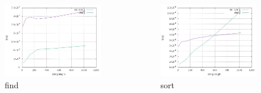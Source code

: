 \documentclass{beamer}
\begin{document}
\begin{frame}
    \begin{columns}[T]
        \begin{figure}
            \includegraphics[width=\textwidth,height=0.8\textheight,keepaspectratio]
					{string_vs_raw_find.jpeg}
        \caption{find}
        \end{figure}
        \begin{figure}
        \includegraphics[width=\textwidth,height=0.8\textheight,keepaspectratio]
					{string_vs_raw_sort.jpeg}
        \caption{sort}
        \end{figure}
    \end{columns}
\end{frame}
\end{document}
